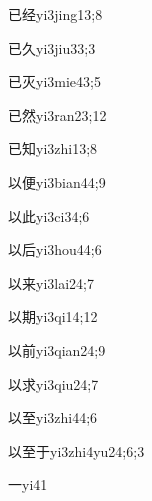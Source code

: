 \begin{verbete}{已经}{yi3jing1}{3;8}
\end{verbete}
\begin{verbete}{已久}{yi3jiu3}{3;3}
\end{verbete}
\begin{verbete}{已灭}{yi3mie4}{3;5}
\end{verbete}
\begin{verbete}{已然}{yi3ran2}{3;12}
\end{verbete}
\begin{verbete}{已知}{yi3zhi1}{3;8}
\end{verbete}
\begin{verbete}{以便}{yi3bian4}{4;9}
\end{verbete}
\begin{verbete}{以此}{yi3ci3}{4;6}
\end{verbete}
\begin{verbete}{以后}{yi3hou4}{4;6}
\end{verbete}
\begin{verbete}{以来}{yi3lai2}{4;7}
\end{verbete}
\begin{verbete}{以期}{yi3qi1}{4;12}
\end{verbete}
\begin{verbete}{以前}{yi3qian2}{4;9}
\end{verbete}
\begin{verbete}{以求}{yi3qiu2}{4;7}
\end{verbete}
\begin{verbete}{以至}{yi3zhi4}{4;6}
\end{verbete}
\begin{verbete}{以至于}{yi3zhi4yu2}{4;6;3}
\end{verbete}
\begin{verbete}{一}{yi4}{1}
\end{verbete}
